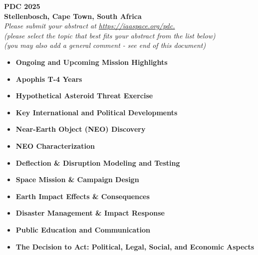 \documentclass[final,1p,times]{elsarticle}
\begin{document}
\begin{frontmatter}

\begin{center}
\small \textbf{PDC 2025} \\ \textbf{Stellenbosch, Cape Town, South Africa} \\ \vspace{0.1in} \textit{Please submit your abstract at \url{https://iaaspace.org/pdc.}} \\ \vspace{0.1in} \textit{(please select the topic that best fits your abstract from the list below)} \\ \textit{(you may also add a general comment - see end of this document)}
\end{center}

  \noindent
\begin{itemize}
  \setlength\itemsep{-.4em}

  \item[$\Box$] \textbf{Ongoing and Upcoming Mission Highlights}

  \item[$\Box$] \textbf{Apophis T-4 Years}

  \item[$\Box$] \textbf{Hypothetical Asteroid Threat Exercise}

  \item[$\Box$] \textbf{Key International and Political Developments}

  \item[$\Box$] \textbf{Near-Earth Object (NEO) Discovery}

  \item[$\Box$] \textbf{NEO Characterization}

  \item[$\Box$] \textbf{Deflection \& Disruption Modeling and Testing}

  \item[$\Box$] \textbf{Space Mission \& Campaign Design}

  \item[$\Box$] \textbf{Earth Impact Effects \& Consequences}

  \item[$\Box$] \textbf{Disaster Management \& Impact Response}

  \item[$\Box$] \textbf{Public Education and Communication}

  \item[$\Box$] \textbf{The Decision to Act: Political, Legal, Social, and Economic Aspects}


\end{itemize}
\end{frontmatter}
\end{document}

